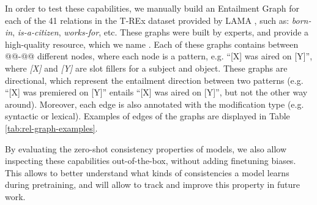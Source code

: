 In order to test these capabilities, we manually build an Entailment Graph \cite{berant2011global,berant2012global,javad2018learning,hosseini2019duality} for each of the 41 relations in the T-REx dataset \cite{trex} provided by LAMA \cite{lama}, such as: \textit{born-in}, \textit{is-a-citizen}, \textit{works-for}, etc. 
These graphs were built by experts, and provide a high-quality resource, which we name \resource{}.
Each of these graphs contains between @@-@@ different nodes, where each node is a pattern, e.g. ``[X] was aired on [Y]'', where \textit{[X]} and \textit{[Y]} are slot fillers for a subject and object.
These graphs are directional, which represent the entailment direction between two patterns (e.g. ``[X] was premiered on [Y]'' entails ``[X] was aired on [Y]'', but not the other way around).
Moreover, each edge is also annotated with the modification type (e.g. syntactic or lexical). %
Examples of edges of the graphs are displayed in Table \ref{tab:rel-graph-examples}.



By evaluating the zero-shot consistency properties of models, we also allow inspecting these capabilities out-of-the-box, without adding finetuning biases. This allows to better understand what kinds of consistencies a model learns during pretraining, and will allow to track and improve this property in future work.


